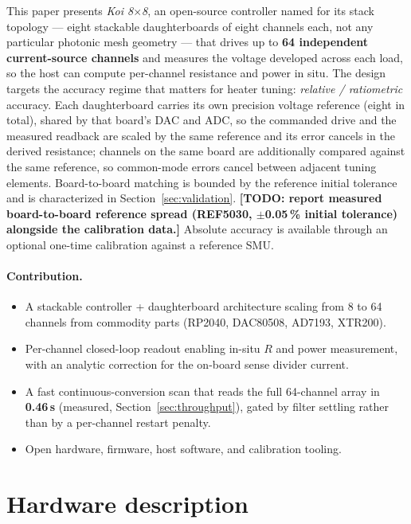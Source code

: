 \documentclass[11pt]{article}
\newif\ifdraft\drafttrue
\newcommand{\todo}[1]{\ifdraft{\color{red}\textbf{[TODO: #1]}}\fi}
\begin{document}
This paper presents \emph{Koi 8$\times$8}, an open-source controller named for
its stack topology --- eight stackable daughterboards of eight channels each,
not any particular photonic mesh geometry --- that drives up to \textbf{64
independent current-source channels} and measures the
voltage developed across each load, so the host can compute per-channel
resistance and power in situ. The design targets the accuracy regime that
matters for heater tuning: \emph{relative / ratiometric} accuracy. Each
daughterboard carries its own precision voltage reference (eight in total),
shared by that board's DAC and ADC, so the commanded drive and the measured
readback are scaled by the same reference and its error cancels in the derived
resistance; channels on the same board are additionally compared against the
same reference, so common-mode errors cancel between adjacent tuning elements.
Board-to-board matching is bounded by the reference initial tolerance and is
characterized in Section~\ref{sec:validation}. \todo{report measured
board-to-board reference spread (REF5030, $\pm$0.05\,\% initial tolerance)
alongside the calibration data.} Absolute accuracy is available through an
optional one-time calibration against a reference SMU.

\paragraph{Contribution.}
\begin{itemize}[nosep]
  \item A stackable controller + daughterboard architecture scaling from 8 to
        64 channels from commodity parts (RP2040, DAC80508, AD7193, XTR200).
  \item Per-channel closed-loop readout enabling in-situ $R$ and power
        measurement, with an analytic correction for the on-board sense
        divider current.
  \item A fast continuous-conversion scan that reads the full 64-channel array
        in \textbf{0.46\,s} (measured, Section~\ref{sec:throughput}), gated by
        filter settling rather than by a per-channel restart penalty.
  \item Open hardware, firmware, host software, and calibration tooling.
\end{itemize}

\section{Hardware description}
\label{sec:description}
\end{document}
